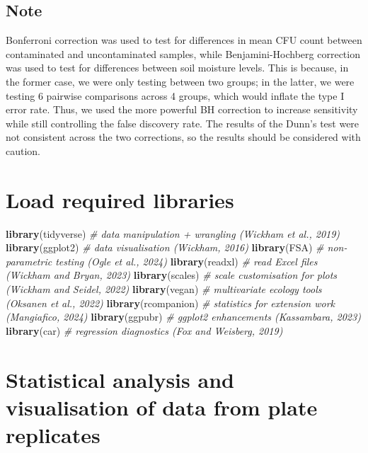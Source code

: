 \documentclass[
]{article}
\newenvironment{Shaded}{\begin{snugshade}}{\end{snugshade}}
\newcommand{\CommentTok}[1]{\textcolor[rgb]{0.56,0.35,0.01}{\textit{#1}}}
\newcommand{\FunctionTok}[1]{\textcolor[rgb]{0.13,0.29,0.53}{\textbf{#1}}}
\newcommand{\NormalTok}[1]{#1}
\begin{document}
\subsection{Note}\label{note}

Bonferroni correction was used to test for differences in mean CFU count
between contaminated and uncontaminated samples, while
Benjamini-Hochberg correction was used to test for differences between
soil moisture levels. This is because, in the former case, we were only
testing between two groups; in the latter, we were testing 6 pairwise
comparisons across 4 groups, which would inflate the type I error rate.
Thus, we used the more powerful BH correction to increase sensitivity
while still controlling the false discovery rate. The results of the
Dunn's test were not consistent across the two corrections, so the
results should be considered with caution.

\section{Load required libraries}\label{load-required-libraries}

\begin{Shaded}
\begin{Highlighting}[]
\FunctionTok{library}\NormalTok{(tidyverse)      }\CommentTok{\# data manipulation + wrangling (Wickham et al., 2019)}
\FunctionTok{library}\NormalTok{(ggplot2)        }\CommentTok{\# data visualisation (Wickham, 2016)}
\FunctionTok{library}\NormalTok{(FSA)            }\CommentTok{\# non{-}parametric testing (Ogle et al., 2024)}
\FunctionTok{library}\NormalTok{(readxl)         }\CommentTok{\# read Excel files (Wickham and Bryan, 2023)}
\FunctionTok{library}\NormalTok{(scales)         }\CommentTok{\# scale customisation for plots (Wickham and Seidel, 2022)}
\FunctionTok{library}\NormalTok{(vegan)          }\CommentTok{\# multivariate ecology tools (Oksanen et al., 2022)}
\FunctionTok{library}\NormalTok{(rcompanion)     }\CommentTok{\# statistics for extension work (Mangiafico, 2024)}
\FunctionTok{library}\NormalTok{(ggpubr)         }\CommentTok{\# ggplot2 enhancements (Kassambara, 2023)}
\FunctionTok{library}\NormalTok{(car)            }\CommentTok{\# regression diagnostics (Fox and Weisberg, 2019)}
\end{Highlighting}
\end{Shaded}

\section{Statistical analysis and visualisation of data from plate
replicates}\label{statistical-analysis-and-visualisation-of-data-from-plate-replicates}
\end{document}
